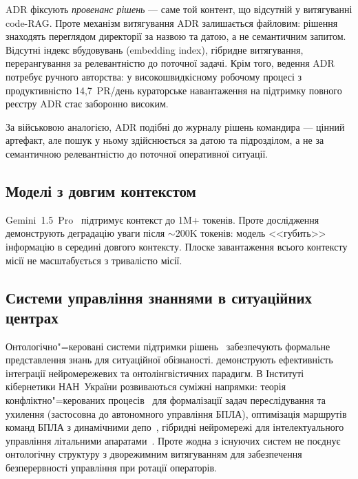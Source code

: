 \documentclass[11pt]{article}
\begin{document}
ADR фіксують \emph{провенанс рішень} --- саме той контент, що відсутній у витягуванні code-RAG.
Проте механізм витягування ADR залишається файловим: рішення знаходять переглядом директорії за назвою та датою, а не семантичним запитом.
Відсутні індекс вбудовувань (embedding index), гібридне витягування, перерангування за релевантністю до поточної задачі.
Крім того, ведення ADR потребує ручного авторства: у високошвидкісному робочому процесі з продуктивністю 14,7~PR/день кураторське навантаження на підтримку повного реєстру ADR стає заборонно високим.

За військовою аналогією, ADR подібні до журналу рішень командира --- цінний артефакт, але пошук у ньому здійснюється за датою та підрозділом, а не за семантичною релевантністю до поточної оперативної ситуації.

\subsection{Моделі з довгим контекстом}

Gemini~1.5~Pro~\citep{reid2024gemini} підтримує контекст до 1M+ токенів.
Проте дослідження~\citep{liu2023lost, hsieh2024ruler, li2024longcontextbench} демонструють деградацію уваги після ${\sim}200$K токенів: модель <<губить>> інформацію в середині довгого контексту.
Плоске завантаження всього контексту місії не масштабується з тривалістю місії.

\subsection{Системи управління знаннями в ситуаційних центрах}

Онтологічно"=керовані системи підтримки рішень~\citep{palagin2006architecture} забезпечують формальне представлення знань для ситуаційної обізнаності.
\citet{palagin2024neural} демонструють ефективність інтеграції нейромережевих та онтолінгвістичних парадигм.
В Інституті кібернетики НАН~України розвиваються суміжні напрямки: теорія конфліктно"=керованих процесів~\citep{chikrii1997conflict} для формалізації задач переслідування та ухилення (застосовна до автономного управління БПЛА), оптимізація маршрутів команд БПЛА з динамічними депо~\citep{horbulin2020uavroutes}, гібридні нейромережі для інтелектуального управління літальними апаратами~\citep{zgurovsky2021hybridnn}.
Проте жодна з існуючих систем не поєднує онтологічну структуру з дворежимним витягуванням для забезпечення безперервності управління при ротації операторів.
\end{document}
